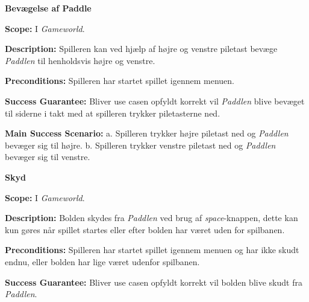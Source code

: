 \textbf{Bevægelse af Paddle}\newline

\textbf{Scope:}\newline
I \textit{Gameworld}.\newline

\textbf{Description:} \newline
Spilleren kan ved hjælp af højre og venstre piletast bevæge \textit{Paddlen} til henholdsvis højre og venstre.\newline

\textbf{Preconditions:}\newline
Spilleren har startet spillet igennem menuen.\newline

\textbf{Success Guarantee:}\newline
Bliver use casen opfyldt korrekt vil \textit{Paddlen} blive bevæget til siderne i takt med at spilleren trykker piletasterne ned.\newline

\textbf{Main Success Scenario:}\newline
 a. Spilleren trykker højre piletast ned og \textit{Paddlen} bevæger sig til højre.\newline
 b. Spilleren trykker venstre piletast ned og \textit{Paddlen} bevæger sig til venstre.\newline \newline


\textbf{Skyd}\newline

\textbf{Scope:}\newline
I \textit{Gameworld}.\newline

\textbf{Description:} \newline
Bolden skydes fra \textit{Paddlen} ved brug af \textit{space}-knappen, dette kan kun gøres når spillet startes eller efter bolden har været uden for spilbanen. \newline

\textbf{Preconditions:}\newline
Spilleren har startet spillet igennem menuen og har ikke skudt endnu, eller bolden har lige været udenfor spilbanen.\newline

\textbf{Success Guarantee:}\newline
Bliver use casen opfyldt korrekt vil bolden blive skudt fra \textit{Paddlen}.\newline

